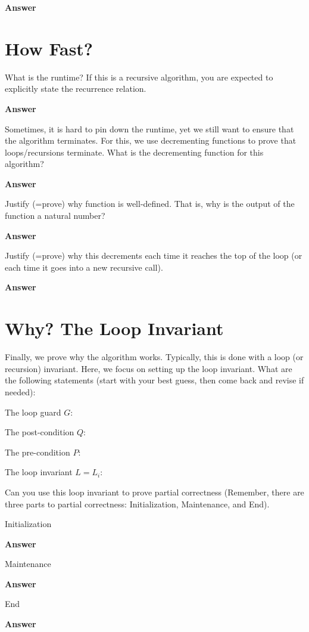 \documentclass{article}
\begin{document}
\textbf{Answer}
\vspace{1in}

\pagebreak
\section{How Fast?}

What is the runtime?  If this is a recursive algorithm, you are expected to
explicitly state the recurrence relation.

\textbf{Answer}
\vspace{1in}

Sometimes, it is hard to pin down the runtime, yet we still want to ensure that
the algorithm terminates.  For this, we use decrementing functions to prove that
loops/recursions terminate.
What is the decrementing function for this algorithm?

\textbf{Answer}
\vspace{1in}

Justify (=prove) why function is well-defined.  That is, why is the output of
the function a natural number?

\textbf{Answer}
\vspace{1in}

Justify (=prove) why this decrements each time it reaches the top of the loop
(or each time it goes into a new recursive call).

\textbf{Answer}
\vspace{1in}


\pagebreak
\section{Why? The Loop Invariant}

Finally, we prove why the algorithm works.  Typically, this is done with a loop
(or recursion) invariant.  Here, we focus on setting up the loop invariant.
What
are the following statements (start with your best guess, then come back and
revise if needed):

The loop guard $G$:
\vspace{0.5in}

The post-condition $Q$:
\vspace{0.5in}

The pre-condition $P$:
\vspace{0.5in}

The loop invariant $L=L_i$:
\vspace{0.5in}


Can you use this loop invariant
to prove partial correctness (Remember, there are three parts to partial
correctness: Initialization, Maintenance, and End).

Initialization

\textbf{Answer}
\vspace{1in}


Maintenance

\textbf{Answer}
\vspace{1in}


End

\textbf{Answer}
\vspace{1in}
\end{document}
